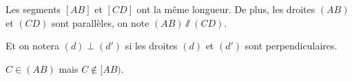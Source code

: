 Les segments $[AB]$ et $[CD]$ ont la même longueur.
De plus, les droites $(AB)$ et $(CD)$ sont parallèles, on note $(AB) \sslash (CD)$.\par
Et on notera $(d) \perp (d')$ si les droites $(d)$ et $(d')$ sont perpendiculaires.\medskip

$C \in (AB)$ mais $C \notin [AB)$.
